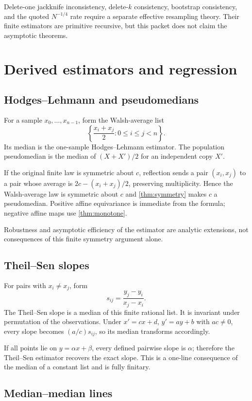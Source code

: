 \documentclass[11pt]{article}
\begin{document}
Delete-one jackknife inconsistency, delete-$k$ consistency, bootstrap
consistency, and the quoted $N^{-1/4}$ rate require a separate effective
resampling theory.  Their finite estimators are primitive recursive, but this
packet does not claim the asymptotic theorems.

\section{Derived estimators and regression}

\subsection{Hodges--Lehmann and pseudomedians}

For a sample $x_0,\ldots,x_{n-1}$, form the Walsh-average list
\[
 \left\{\frac{x_i+x_j}{2}:0\leq i\leq j<n\right\}.
\]
Its median is the one-sample Hodges--Lehmann estimator.  The population
pseudomedian is the median of $(X+X')/2$ for an independent copy $X'$.

If the original finite law is symmetric about $c$, reflection sends a pair
$(x_i,x_j)$ to a pair whose average is $2c-(x_i+x_j)/2$, preserving
multiplicity.  Hence the Walsh-average law is symmetric about $c$ and
\cref{thm:symmetry} makes $c$ a pseudomedian.  Positive affine equivariance is
immediate from the formula; negative affine maps use
\cref{thm:monotone}.

Robustness and asymptotic efficiency of the estimator are analytic extensions,
not consequences of this finite symmetry argument alone.

\subsection{Theil--Sen slopes}

For pairs with $x_i\neq x_j$, form
\[
 s_{ij}=\frac{y_j-y_i}{x_j-x_i}.
\]
The Theil--Sen slope is a median of this finite rational list.  It is invariant
under permutation of the observations.  Under
$x'=cx+d$, $y'=ay+b$ with $ac\neq0$, every slope becomes $(a/c)s_{ij}$, so
its median transforms accordingly.

If all points lie on $y=\alpha x+\beta$, every defined pairwise slope is
$\alpha$; therefore the Theil--Sen estimator recovers the exact slope.  This
is a one-line consequence of the median of a constant list and is fully
finitary.

\subsection{Median--median lines}
\end{document}
